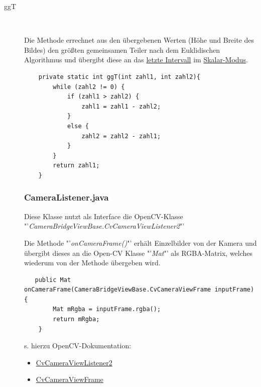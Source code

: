 \begin{description}
\item[ggT]~\par
\label{ggt}
Die Methode errechnet aus den übergebenen Werten (Höhe und Breite des Bildes) den größten gemeinsamen Teiler nach dem Euklidischen Algorithmus und übergibt diese an das \hyperref[max]{letzte Intervall} im \hyperref[quantimode1]{Skalar-Modus}.
\begin{lstlisting}
    private static int ggT(int zahl1, int zahl2){
        while (zahl2 != 0) {
            if (zahl1 > zahl2) {
                zahl1 = zahl1 - zahl2;
            } 
            else {
                zahl2 = zahl2 - zahl1;
            }
        }
        return zahl1;
    }
\end{lstlisting}

\subsubsection{CameraListener.java}
\label{CameraListener}
Diese Klasse nutzt als Interface die OpenCV-Klasse "'\textit{CameraBridgeViewBase.CvCameraViewListener2}"' 

Die Methode "'\textit{onCameraFrame()}"' erhält Einzelbilder von der Kamera und übergibt dieses an die Open-CV Klasse "'\textit{Mat}"' als RGBA-Matrix, welches wiederum von der Methode übergeben wird.

\begin{lstlisting}
   public Mat onCameraFrame(CameraBridgeViewBase.CvCameraViewFrame inputFrame) {
        Mat mRgba = inputFrame.rgba();
        return mRgba;
    }
\end{lstlisting}

s. hierzu OpenCV-Dokumentation:
\begin{itemize}
\item \href{http://docs.opencv.org/java/2.4.9/org/opencv/android/CameraBridgeViewBase.CvCameraViewListener2.html}{CvCameraViewListener2}
\item \href{http://docs.opencv.org/java/2.4.9/org/opencv/android/CameraBridgeViewBase.CvCameraViewFrame.html}{CvCameraViewFrame}
\end{itemize}

\end{description}






